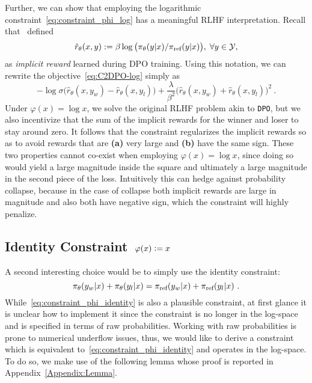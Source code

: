 Further, we can show that employing the logarithmic constraint~\eqref{eq:constraint_phi_log} has a meaningful RLHF interpretation. Recall that~\citet{DPO} defined 
%
\begin{equation}
\label{eq:implicit-reward}
 \hat r_{\theta}(x,y) := \beta\log\big(\pi_{\theta}(y|x)/\pi_{\textrm{ref}}(y|x)\big),\;\forall y\in\mathcal Y,  
\end{equation}
%
as {\em implicit reward} learned during DPO training. Using this notation, we can rewrite the objective~\eqref{eq:C2DPO-log} simply as
%
\begin{equation*}
-\log \sigma\big( \hat r_{\theta}(x , y_w) - \hat r_{\theta}(x , y_l)\big) + \frac{\lambda}{\beta^{2}}\big( \hat r_{\theta}(x , y_w) +  \hat r_{\theta}(x , y_l)\big)^{2}\ .
\end{equation*}
%
Under $\varphi(x) = \log x$, we solve the original RLHF problem akin to \texttt{DPO}, but we also incentivize that the sum of the implicit rewards for the winner and loser to stay around zero. It follows that the constraint regularizes the implicit rewards so as to avoid rewards that are {\bf (a)} very large and {\bf (b)} have the same sign. These two properties cannot co-exist when employing $\varphi(x) = \log x$, since doing so would yield a large magnitude inside the square and ultimately a large magnitude in the second piece of the loss. Intuitively this can hedge against probability collapse, because in the case of collapse both implicit rewards are large in magnitude and also both have negative sign, which the constraint will highly penalize.


\subsection{Identity Constraint $\;\varphi(x) \mathrel{\mathop:}= x$}
\label{subsec:Identity-constraint}

A second interesting choice would be to simply use the identity constraint:
%
\begin{equation}
    \pi_{\theta}(y_w|x) + \pi_{\theta}(y_l|x)  = \pi_{\textrm{ref}}(y_w|x) + \pi_{\textrm{ref}}(y_l|x)\ .
    \label{eq:constraint_phi_identity}
\end{equation}
%
While~\eqref{eq:constraint_phi_identity} is also a plausible constraint, at first glance it is unclear how to implement it since the constraint is no longer in the log-space and is specified in terms of raw probabilities. Working with raw probabilities is prone to numerical underflow issues, thus, we would like to derive a constraint which is equivalent to~\eqref{eq:constraint_phi_identity} and operates in the log-space. To do so, we make use of the following lemma whose proof is reported in Appendix~\ref{Appendix:Lemma}.

